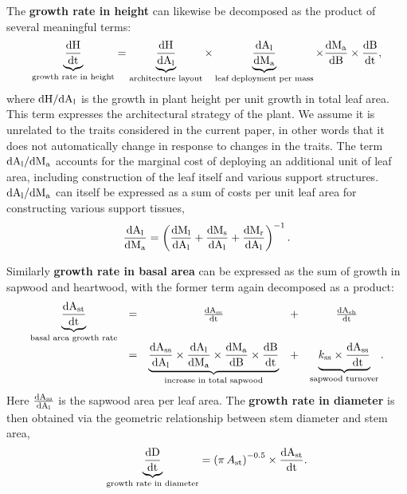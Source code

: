 \documentclass[a4paper,11pt]{article}
\begin{document}
The \textbf{growth rate in height} can likewise be decomposed as the product of several meaningful terms:
\begin{equation}\label{eq:eq2}
\underbrace{\frac{\rm{d} H}{\rm{d} t}}_{\text{growth rate in height}} = \underbrace{\frac{\rm{d} H}{\rm{d} A_{\rm l}}}_{\text{architecture layout}} \times \underbrace{{\frac{\rm{d} A_{\rm l}}{\rm{d} M_{\rm a} }}}_{\text{leaf deployment per mass}} \times {\frac{\ensuremath{\rm{d}}M_{\rm a} }{\ensuremath{\rm{d}}B}} \times {\frac{\ensuremath{\rm{d}}B}{\ensuremath{\rm{d}}t}},
\end{equation}
where $\rm{d} H / \rm{d} A_{\rm l}$ is the growth in plant height
per unit growth in total leaf area. This term expresses the architectural
strategy of the plant. We assume it is unrelated to the traits considered in the current paper, in other words that it does not automatically change in response to changes in the traits. The term $\rm{d} A_{\rm l} / \rm{d} M_{\rm a} $
accounts for the marginal cost of deploying an additional unit of leaf
area, including construction of the leaf itself and various support
structures.  $\rm{d} A_{\rm l} / \rm{d} M_{\rm a} $
can itself be expressed as a sum of costs per unit leaf
area for constructing various support tissues,
\begin{equation}\label{eq:daldmt}
\frac{\rm{d} A_{\rm l}}{\rm{d} M_{\rm a} }
= \left(\frac{\rm{d} M_{\rm l}}{\rm{d} A_{\rm l}}
 +  \frac{\rm{d} M_{\rm s}}{\rm{d} A_{\rm l}} + \frac{\rm{d} M_{\rm r}}{\rm{d} A_{\rm l}}\right)^{-1}.
\end{equation}

Similarly \textbf{growth rate in basal area} can be expressed as the sum of growth in sapwood and heartwood, with the former term again decomposed as a product:
\begin{equation}\label{eq:eq3}
\begin{array}{ccccc}
\underbrace{{\frac{\rm{d} A_{\rm st}}{\rm{d} t}}}_{\text{basal area growth rate}} &=& \frac{\rm{d} A_{\rm ss}}{\rm{d} t} &+& \frac{\rm{d} A_{\rm sh}}{\rm{d} t} \\
&=& \underbrace{\frac{\rm{d} A_{\rm ss}}{\rm{d} A_{\rm l}}  \times {\frac{\ensuremath{\rm{d}}A_{\rm l}}{\ensuremath{\rm{d}}M_{\rm a} }} \times  {\frac{\ensuremath{\rm{d}}M_{\rm a} }{\ensuremath{\rm{d}}B}} \times {\frac{\ensuremath{\rm{d}}B}{\ensuremath{\rm{d}}t}}}_{\text{increase in total sapwood}} &+&  \underbrace{k_{\rm ss} \times \frac{\rm{d} A_{\rm ss}}{\rm{d} t}}_{\text{sapwood turnover}}.\\
\end{array}
\end{equation}
Here $\frac{\rm{d} A_{\rm ss}}{\rm{d} A_{\rm l}} $ is the  sapwood area per leaf area. The \textbf{growth rate in diameter} is then obtained via the geometric relationship between stem diameter and stem area,
\begin{equation}\label{eq:eq4}
\underbrace{\frac{\rm{d} D}{\rm{d} t}}_{\text{growth rate in diameter}} = \left(\pi \, A_{\rm st}\right)^{-0.5} \times {\frac{\ensuremath{\rm{d}}A_{\rm st}}{\ensuremath{\rm{d}}t}}.
\end{equation}
\end{document}
